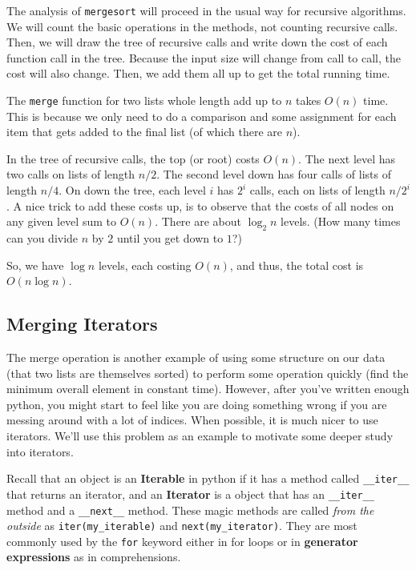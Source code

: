 The analysis of \texttt{mergesort} will proceed in the usual way for recursive algorithms.
We will count the basic operations in the methods, not counting recursive calls.
Then, we will draw the tree of recursive calls and write down the cost of each function call in the tree.
Because the input size will change from call to call, the cost will also change.
Then, we add them all up to get the total running time.


The \texttt{merge} function for two lists whole length add up to $n$ takes $O(n)$ time.
This is because we only need to do a comparison and some assignment for each item that gets added to the final list (of which there are $n$).


In the tree of recursive calls, the top (or root) costs $O(n)$.
The next level has two calls on lists of length $n/2$.
The second level down has four calls of lists of length $n/4$.
On down the tree, each level $i$ has $2^i$ calls, each on lists of length $n/2^i$.
A nice trick to add these costs up, is to observe that the costs of all nodes on any given level sum to $O(n)$.
There are about $\log_2 n$ levels. (How many times can you divide $n$ by $2$ until you get down to $1$?)


So, we have $\log n$ levels, each costing $O(n)$, and thus, the total cost is $O(n \log n)$.

\subsection{Merging Iterators}


The merge operation is another example of using some structure on our data (that two lists are themselves sorted) to perform some operation quickly (find the minimum overall element in constant time).
However, after you've written enough python, you might start to feel like you are doing something wrong if you are messing around with a lot of indices.
When possible, it is much nicer to use iterators.
We'll use this problem as an example to motivate some deeper study into iterators.


Recall that an object is an \textbf{Iterable} in python if it has a method called \texttt{\_\_iter\_\_} that returns an iterator,
and an \textbf{Iterator} is a object that has an \texttt{\_\_iter\_\_} method and a \texttt{\_\_next\_\_} method.
These magic methods are called \emph{from the outside} as \texttt{iter(my\_iterable)} and \texttt{next(my\_iterator)}.
They are most commonly used by the \texttt{for} keyword either in for loops or in \textbf{generator expressions} as in comprehensions.


